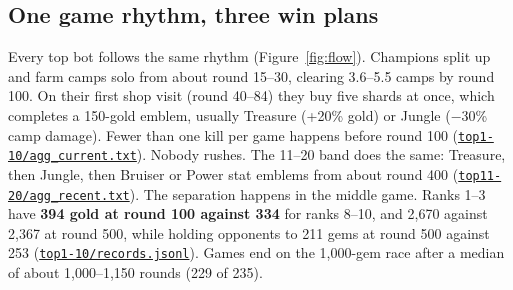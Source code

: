 \documentclass[11pt,a4paper]{article}
\newcommand{\scratch}{file:///private/tmp/claude-501/-Users-tristanbasri-Desktop-Code-cambridge-battlecode-s2/b3f4cb6b-e46a-405f-957c-42c44c05c8dc/scratchpad/ladder-data}
\newcommand{\src}[2]{{\small(\href{#1}{\textcolor{cTop}{\texttt{#2}}})}}
\begin{document}
\subsection{One game rhythm, three win plans}

Every top bot follows the same rhythm (Figure~\ref{fig:flow}). Champions split up and farm camps solo from about round 15--30, clearing 3.6--5.5 camps by round 100. On their first shop visit (round 40--84) they buy five shards at once, which completes a 150-gold emblem, usually Treasure (+20\% gold) or Jungle ($-$30\% camp damage). Fewer than one kill per game happens before round 100 \src{\scratch/top1-10/agg_current.txt}{top1-10/agg\_current.txt}. Nobody rushes. The 11--20 band does the same: Treasure, then Jungle, then Bruiser or Power stat emblems from about round 400 \src{\scratch/top11-20/agg_recent.txt}{top11-20/agg\_recent.txt}. The separation happens in the middle game. Ranks 1--3 have \textbf{394 gold at round 100 against 334} for ranks 8--10, and 2,670 against 2,367 at round 500, while holding opponents to 211 gems at round 500 against 253 \src{\scratch/top1-10/records.jsonl}{top1-10/records.jsonl}. Games end on the 1,000-gem race after a median of about 1,000--1,150 rounds (229 of 235).
\end{document}
